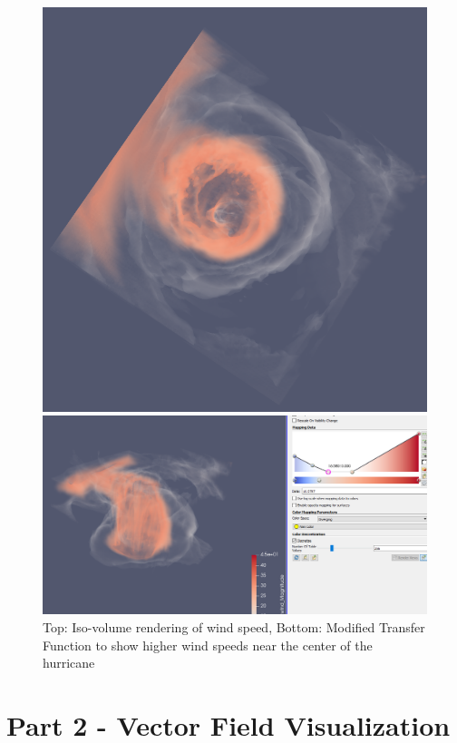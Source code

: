 \documentclass[a4paper,11pt]{article}
\theoremstyle{mytheor}
\begin{document}
\begin{figure}[!h]
    \centering
    \includegraphics[scale=0.8]{Figures/P1_4_3.PNG}
    
    \vspace{0.5 cm}
    \includegraphics[scale=0.5]{Figures/P1_4_4.PNG}
    \caption{Top: Iso-volume rendering of wind speed, Bottom: Modified Transfer Function to show higher wind speeds near the center of the hurricane}
    \label{p1_5}
\end{figure}


\clearpage

\section{Part 2 - Vector Field Visualization}
\end{document}
